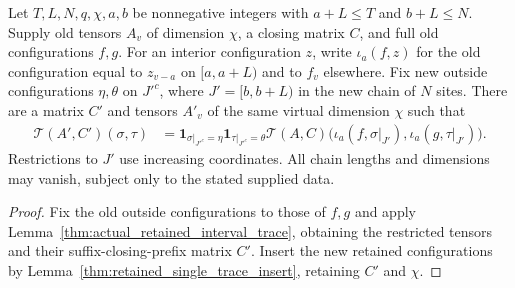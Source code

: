 \begin{lemma}
    \label{thm:trace_interval_slice_configuration_extend}
    \leanok
    Let $T,L,N,q,\chi,a,b$ be nonnegative integers with $a+L\le T$ and
    $b+L\le N$. Supply old tensors $A_v$ of dimension $\chi$, a closing
    matrix $C$, and full old configurations $f,g$. For an interior
    configuration $z$, write $\iota_a(f,z)$ for the old configuration
    equal to $z_{v-a}$ on $[a,a+L)$ and to $f_v$ elsewhere.
    Fix new outside configurations $\eta,\theta$ on
    $J'^c$, where $J'=[b,b+L)$ in the new chain of $N$ sites.
    There are a matrix $C'$ and tensors $A'_v$ of the same virtual
    dimension $\chi$ such that
    \begin{align}
        \mathcal T(A',C')(\sigma,\tau)
         & =\mathbf1_{\sigma|_{J'^c}=\eta}\mathbf1_{\tau|_{J'^c}=\theta}
        \mathcal T(A,C)\bigl(\iota_a(f,\sigma|_{J'}),
        \iota_a(g,\tau|_{J'})\bigr).
        \label{eq:trace_interval_slice_configuration_extend}
    \end{align}
    Restrictions to $J'$ use increasing coordinates. All chain lengths and
    dimensions may vanish, subject only to the stated supplied data.
\end{lemma}
\begin{proof}\leanok
    Fix the old outside configurations to those of $f,g$ and apply
    Lemma~\ref{thm:actual_retained_interval_trace}, obtaining the restricted
    tensors and their suffix-closing-prefix matrix $C'$.
    Insert the new retained configurations by
    Lemma~\ref{thm:retained_single_trace_insert}, retaining $C'$ and $\chi$.
\end{proof}


